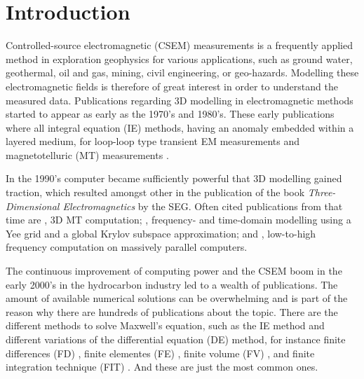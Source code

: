 \documentclass[
    paper,
  ]{geophysics}
\begin{document}
\section{Introduction}

Controlled-source electromagnetic (CSEM) measurements is a frequently applied
method in exploration geophysics for various applications, such as ground
water, geothermal, oil and gas, mining, civil engineering, or geo-hazards.
Modelling these electromagnetic fields is therefore of great interest in order
to understand the measured data. Publications regarding 3D modelling in
electromagnetic methods started to appear as early as the 1970's and 1980's.
These early publications where all integral equation (IE) methods, having an
anomaly embedded within a layered medium, for loop-loop type transient EM
measurements \citep{GJI.74.Raiche, GEO.75.Hohmann, GJI.82.Das, GEO.86.Newman}
and magnetotelluric (MT) measurements \citep{GEO.84.Wannamaker}.

In the 1990's computer became sufficiently powerful that 3D modelling gained
traction, which resulted amongst other in the publication of the book
\emph{Three-Dimensional Electromagnetics} \citep{B.SEG.99.Oristaglio} by the
SEG. Often cited publications from that time are \cite{RSC.94.Mackie}, 3D MT
computation; \cite{RS.94.Druskin}, frequency- and time-domain modelling using a
Yee grid and a global Krylov subspace approximation; and \cite{RS.96.Alumbaugh,
GJI.97.Newman}, low-to-high frequency computation on massively parallel
computers.

The continuous improvement of computing power and the CSEM boom in the early
2000's in the hydrocarbon industry led to a wealth of publications. The amount
of available numerical solutions can be overwhelming and is part of the reason
why there are hundreds of publications about the topic. There are the different
methods to solve Maxwell's equation, such as the IE method
\citep{GJI.74.Raiche, RS.02.Hursan, GEO.06.Zhdanov, GP.10.Tehrani,
CAG.16.Kruglyakov, MGS.17.Kruglyakov} and different variations of the
differential equation (DE) method, for instance finite differences (FD)
\citep{IEEE.66.Yee, RSC.94.Mackie, RS.94.Druskin, GEO.09.Streich,
CAG.13.Sommer}, finite elementes (FE) \citep{GJI.11.Schwarzbach,
GEO.12.daSilva, GJI.13.Puzyrev, GJI.13.Grayver, SEG.16.Zhang}, finite volume
(FV) \citep{EM.90.Madsen, ECP.07.Haber, GEO.14.Jahandari}, and finite
integration technique (FIT) \citep{PIER.01.Clemens, GP.06.Mulder}. And these
are just the most common ones.
\end{document}
